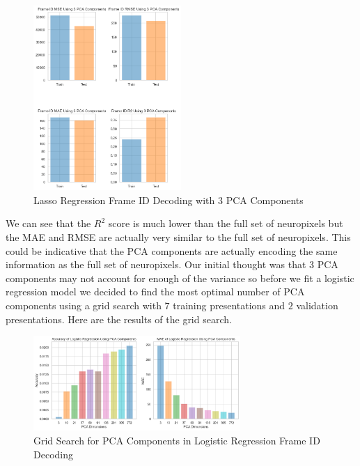 \documentclass[12pt, letterpaper]{article}
\begin{document}
\begin{figure}[H]
    \centering
    \includegraphics[width=0.5\textwidth]{frame_id_metrics_lasso_using_pca.08.png}
    \caption{Lasso Regression Frame ID Decoding with 3 PCA Components}
    \label{fig:pca_frame_id_lasso}
\end{figure}

We can see that the $R^2$ score is much lower than the full set of neuropixels but the MAE and RMSE are actually very similar to the full set of neuropixels. This could be indicative that the PCA components are actually encoding the same information as the full set of neuropixels. Our initial thought was that $3$ PCA components may not account for enough of the variance so before we fit a logistic regression model we decided to find the most optimal number of PCA components using a grid search with $7$ training presentations and $2$ validation presentations. Here are the results of the grid search.

\begin{figure}[H]
    \centering
    \includegraphics[width=0.7\textwidth]{logistic_pca_accuracy_mae.png}
    \caption{Grid Search for PCA Components in Logistic Regression Frame ID Decoding}
    \label{fig:logistic_pca_accuracy_mae}
\end{figure}
\end{document}
